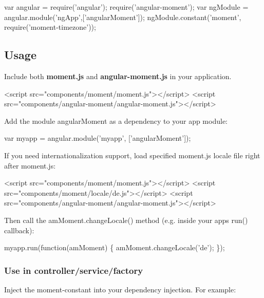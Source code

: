 \begin{DoxyCode}
var angular = require('angular');
require('angular-moment');
var ngModule = angular.module('ngApp',['angularMoment']);
ngModule.constant('moment', require('moment-timezone'));
\end{DoxyCode}


\subsection*{Usage }

Include both {\bfseries moment.\+js} and {\bfseries angular-\/moment.\+js} in your application.


\begin{DoxyCode}
<script src="components/moment/moment.js"></script>
<script src="components/angular-moment/angular-moment.js"></script>
\end{DoxyCode}


Add the module {\ttfamily angular\+Moment} as a dependency to your app module\+:


\begin{DoxyCode}
var myapp = angular.module('myapp', ['angularMoment']);
\end{DoxyCode}


If you need internationalization support, load specified moment.\+js locale file right after moment.\+js\+:


\begin{DoxyCode}
<script src="components/moment/moment.js"></script>
<script src="components/moment/locale/de.js"></script>
<script src="components/angular-moment/angular-moment.js"></script>
\end{DoxyCode}


Then call the {\ttfamily am\+Moment.\+change\+Locale()} method (e.\+g. inside your app\textquotesingle{}s run() callback)\+:


\begin{DoxyCode}
myapp.run(function(amMoment) \{
    amMoment.changeLocale('de');
\});
\end{DoxyCode}


\subsubsection*{Use in controller/service/factory}

Inject the {\ttfamily moment}-\/constant into your dependency injection. For example\+:





